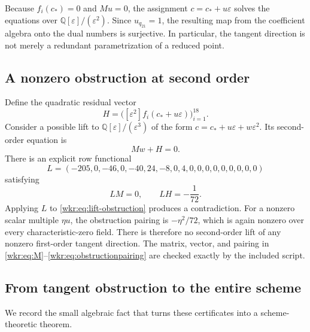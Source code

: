 \documentclass[11pt,a4paper]{article}
\numberwithin{equation}{section}
\theoremstyle{definition}
\theoremstyle{remark}
\newcommand{\Q}{\mathbb{Q}}
\newcommand{\cstar}{c_*}
\newcommand{\eps}{\varepsilon}
\begin{document}
Because $f_i(\cstar)=0$ and $Mu=0$, the assignment
$c=\cstar+u\eps$ solves the equations over $\Q[\eps]/(\eps^2)$.
Since $u_{q_{21}}=1$, the resulting map from the coefficient algebra onto
the dual numbers is surjective. In particular, the tangent direction is
not merely a redundant parametrization of a reduced point.

\subsection{A nonzero obstruction at second order}

Define the quadratic residual vector
\begin{equation}\label{wkr:eq:H}
H=\bigl([\eps^2]f_i(\cstar+u\eps)\bigr)_{i=1}^{18}.
\end{equation}
Consider a possible lift to $\Q[\eps]/(\eps^3)$ of the form
$c=\cstar+u\eps+w\eps^2$. Its second-order equation is
\begin{equation}\label{wkr:eq:lift-obstruction}
Mw+H=0.
\end{equation}
There is an explicit row functional
\begin{equation}\label{wkr:eq:ell}
L=(-205,0,-46,0,-40,24,-8,0,4,0,0,0,0,0,0,0,0,0)
\end{equation}
satisfying
\begin{equation}\label{wkr:eq:obstructionpairing}
LM=0,\qquad LH=-\frac1{72}.
\end{equation}
Applying $L$ to \eqref{wkr:eq:lift-obstruction} produces a contradiction.
For a nonzero scalar multiple $\eta u$, the obstruction pairing is
$-\eta^2/72$, which is again nonzero over every characteristic-zero field.
There is therefore no second-order lift of any nonzero first-order tangent
direction. The matrix, vector, and pairing in
\eqref{wkr:eq:M}--\eqref{wkr:eq:obstructionpairing} are checked exactly by the
included script.

\subsection{From tangent obstruction to the entire scheme}

We record the small algebraic fact that turns these certificates into a
scheme-theoretic theorem.
\end{document}

